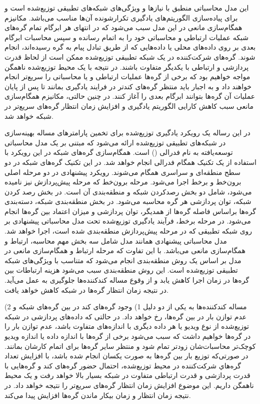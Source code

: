 این مدل محاسباتی منطبق با نیازها و ویژگی‌های شبکه‌های تطبیقی توزیع‌شده است و برای پیاده‌سازی الگوریتم‌های یادگیری تکرارشونده آن‌ها مناسب می‌باشد. مکانیزم همگام‌سازی مانعی در این مدل سبب می‌شود که در انتهای هر ابرگام تمام گره‌های شبکه عملیات ارتباطی و محاسباتی‌ خود را به اتمام رسانده و سپس  محاسبات ابرگام بعدی بر روی داده‌های محلی یا داده‌هایی که از طریق تبادل پیام به گره رسیده‌اند، انجام شوند. گره‌های شرکت‌کننده در یک شبکه تطبیقی توزیع‌شده ممکن است از لحاظ قدرت پردازشی و ارتباطی با یکدیگر متفاوت باشند. در نتیجه با یک محیط توزیع‌شده ناهمگن مواجه خواهیم بود که برخی از گره‌ها عملیات ارتباطی و یا محاسباتی را سریع‌تر انجام خواهند داد و به اجبار باید منتظر گره‌های کندتر در فرایند یادگیری بمانند تا پس از پایان عملیات آن گره‌ها بتوانند ابرگام بعدی را آغاز کنند. در چنین حالتی، مکانیزم همگام‌سازی مانعی سبب کاهش کارایی الگوریتم یادگیری و افزایش زمان انتظار گره‌های سریع‌تر در شبکه خواهد شد.

در این رساله یک رویکرد یادگیری توزیع‌شده برای تخمین پارامترهای مساله بهینه‌سازی در شبکه‌های تطبیقی توزیع‌شده ارائه می‌شود که مبتنی بر یک مدل محاسباتی توسعه‌یافته به نام  فدرالی () است. همگام‌سازی گره‌های شبکه در این رویکرد با استفاده از یک تکنیک همگام‌ فدرالی انجام خواهد شد. در این تکنیک گره‌های شبکه در دو سطح منطقه‌ای و سراسری همگام می‌شوند. رویکرد پیشنهادی در دو مرحله اصلی برون‌خط و برخط اجرا می‌شود. مرحله برون‌خط که مرحله پیش‌پردازش نیز نامیده می‌شود، شامل دو بخش رصدکردن  شبکه و منطقه‌بندی آن است. در بخش رصد کردن شبکه، توان پردازشی هر گره محاسبه می‌شود. در بخش منطقه‌بندی شبکه، دسته‌بندی گره‌ها براساس فاصله گره‌ها از همدیگر، توان پردازشی و میزان اعتماد بین گره‌ها انجام می‌شود. در مرحله برخط، فرآیند یادگیری توزیع‌شده تحت مدل محاسباتی پیشنهادی  بر روی شبکه تطبیقی که در مرحله پیش‌پردازش منطقه‌بندی شده است، اجرا خواهد شد. مدل محاسباتی پیشنهادی همانند مدل  شامل سه بخش مهم محاسبه، ارتباط و همگام‌سازی مانعی می‌باشد. با این تفاوت که مرحله ارتباط و همگام‌سازی مانعی در مدل  بر اساس یک روش منطقه‌بندی‌ انجام می‌شود که متناسب با ویژگی‌های شبکه‌ تطبیقی توزیع‌شده است. این روش منطقه‌بندی سبب می‌شود هزینه ارتباطات بین گره‌ها در زمان اجرا کاهش یابد و از وقوع مساله کندکننده‌ها جلوگیری به عمل می‌آید. در نتیجه زمان انتظار گره‌ها در شبکه کاهش خواهد یافت.

مساله کندکننده‌ها به یکی از دو دلیل 1) وجود گره‌های کند در بین گره‌های شبکه و 2) عدم توازن بار در بین گره‌‌ها، رخ خواهد داد. در حالتی که داد‌ه‌های پردازشی در شبکه توزیع‌شده از نوع ویدیو یا هر داده دیگری با اندازه‌های متفاوت باشد، عدم توازن بار را در گره‌ها خواهیم داشت که سبب می‌شود برخی از گره‌ها با اندازه داده یا اندازه ویدیو کوچک‌تر محاسبات‌شان زودتر تمام شود و منتظر سایر گره‌ها برای اتمام کارشان بمانند. در صورتی‌که توزیع بار بین گره‌ها به صورت یکسان انجام شده باشد، با افزایش تعداد گره‌هاي شرکت‌کننده در محیط توزیع‌شده، احتمال حضور گره‌های کند و گره‌هایی با قدرت پردازشی  و قدرت ارتباطی متفاوت در شبکه بسیار بالا خواهد رفت و یک محیط ناهمگن داریم. این موضوع افزایش زمان انتظار گره‌های سریع‌تر را نتیجه خواهد داد. در نتیجه زمان انتظار و زمان بیکار ماندن گره‌ها افزایش پیدا می‌کند.

